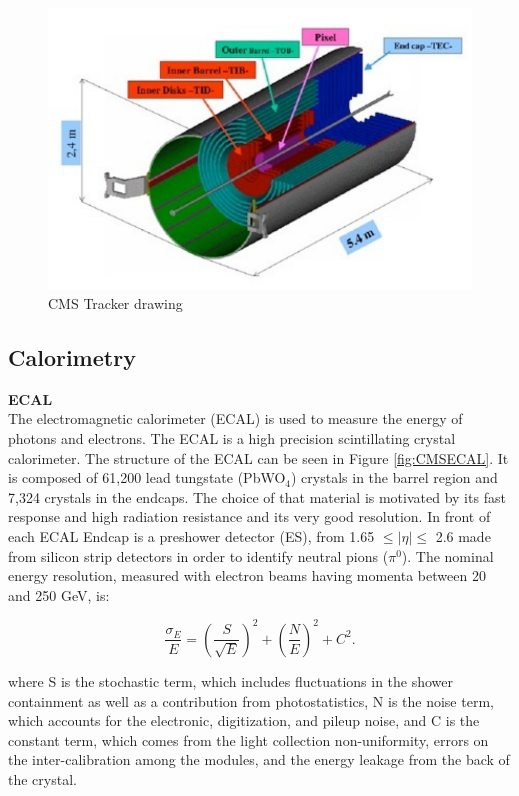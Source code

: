 \begin{figure}
  \includegraphics[width=\largefigwidth]{chap_CMSDetector_figures/cms_tracker_3d_drawing}
  \caption[CMS Tracker 3D drawing]%
  {CMS Tracker drawing}
  \label{fig:CMSTracker}
\end{figure}


\subsection{Calorimetry}

{\bf ECAL} \\


The electromagnetic calorimeter (ECAL) is used to measure the energy of photons 
and electrons. The ECAL is a high precision scintillating crystal calorimeter. The 
structure of the ECAL can be seen in Figure \ref{fig:CMSECAL}. It is composed of 61,200 lead tungstate 
(PbWO$_4$) crystals in the barrel region and 7,324 crystals in the endcaps. The choice 
of that material is motivated by its fast response and high radiation resistance and 
its very good resolution. In front of each ECAL Endcap is a preshower detector (ES),
from 1.65 $ \leq |\eta| \leq$ 2.6 made from silicon strip detectors in order to identify neutral 
pions ($\pi^0$). The nominal energy resolution, measured with electron beams having 
momenta between 20 and 250 GeV, is:
 
\begin{equation}
\label{eq:eqnECAL}
\frac{\sigma_E}{E}=(\frac{S}{\sqrt{E}})^2 + (\frac{N}{E})^2 + C^2.
\end{equation}


where S is the stochastic term, which includes fluctuations in the shower containment 
as well as a contribution from photostatistics, N is the noise term, which accounts 
for the electronic, digitization, and pileup noise, and C is the constant term, which 
comes from the light collection non-uniformity, errors on the inter-calibration among 
the modules, and the energy leakage from the back of the crystal.\\

